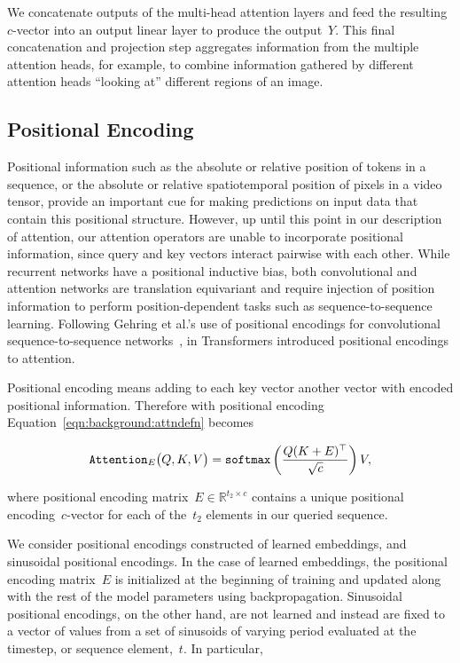 We concatenate outputs of the multi-head attention layers and feed the
resulting~$c$-vector into an output linear layer to produce the output~$Y$.
This final concatenation and projection step aggregates information from the
multiple attention heads, for example, to combine information gathered by
different attention heads ``looking at'' different regions of an image.


\subsection{Positional Encoding}

Positional information such as the absolute or relative position of tokens in a
sequence, or the absolute or relative spatiotemporal position of pixels in a
video tensor, provide an important cue for making predictions on input data
that contain this positional structure.
However, up until this point in our description of attention, our attention
operators are unable to incorporate positional information, since query and key
vectors interact pairwise with each other.
While recurrent networks have a positional inductive bias, both convolutional
and attention networks are translation equivariant and require injection of
position information to perform position-dependent tasks such as
sequence-to-sequence learning.
Following Gehring et al.'s use of positional encodings for convolutional
sequence-to-sequence networks~\citep{gehring2017convolutional}, in Transformers
\citet{vaswani2017attention} introduced positional encodings to attention.

Positional encoding means adding to each key vector another vector with encoded
positional information.
Therefore with positional encoding Equation~\ref{eqn:background:attndefn} becomes

\begin{equation}
\mathtt{Attention}_E\big(Q, K, V\big) = \mathtt{softmax}{}\left(\frac{Q(K + E)^\top}{\sqrt{c}}\right) V,
\label{eqn:background:posenc-attn}
\end{equation}

\noindent where positional encoding matrix~$E \in \mathbb{R}^{t_2\times c}$ contains a
unique positional encoding~$c$-vector for each of the~$t_2$ elements in our
queried sequence.

We consider positional encodings constructed of learned embeddings, and sinusoidal
positional encodings.
In the case of learned embeddings, the positional encoding matrix~$E$ is
initialized at the beginning of training and updated along with the rest of the
model parameters using backpropagation.
Sinusoidal positional encodings, on the other hand, are not learned and instead
are fixed to a vector of values from a set of sinusoids of varying period
evaluated at the timestep, or sequence element,~$t$.
In particular,

